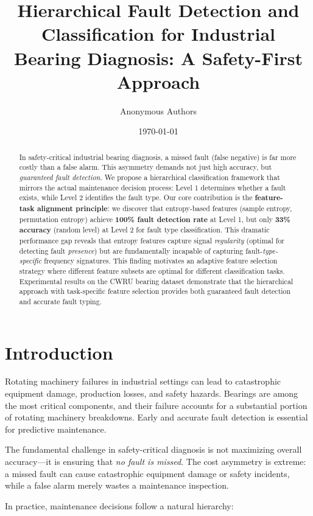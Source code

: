 \documentclass[11pt]{article}
\title{Hierarchical Fault Detection and Classification for Industrial Bearing Diagnosis: A Safety-First Approach}
\author{Anonymous Authors}
\date{\today}
\begin{document}
\maketitle

\begin{abstract}
In safety-critical industrial bearing diagnosis, a missed fault (false negative) is far more costly than a false alarm. This asymmetry demands not just high accuracy, but \emph{guaranteed fault detection}. We propose a hierarchical classification framework that mirrors the actual maintenance decision process: Level 1 determines whether a fault exists, while Level 2 identifies the fault type. Our core contribution is the \textbf{feature-task alignment principle}: we discover that entropy-based features (sample entropy, permutation entropy) achieve \textbf{100\% fault detection rate} at Level 1, but only \textbf{33\% accuracy} (random level) at Level 2 for fault type classification. This dramatic performance gap reveals that entropy features capture signal \emph{regularity} (optimal for detecting fault \emph{presence}) but are fundamentally incapable of capturing fault-\emph{type-specific} frequency signatures. This finding motivates an adaptive feature selection strategy where different feature subsets are optimal for different classification tasks. Experimental results on the CWRU bearing dataset demonstrate that the hierarchical approach with task-specific feature selection provides both guaranteed fault detection and accurate fault typing.
\end{abstract}

\section{Introduction}

Rotating machinery failures in industrial settings can lead to catastrophic equipment damage, production losses, and safety hazards. Bearings are among the most critical components, and their failure accounts for a substantial portion of rotating machinery breakdowns. Early and accurate fault detection is essential for predictive maintenance.

The fundamental challenge in safety-critical diagnosis is not maximizing overall accuracy---it is ensuring that \emph{no fault is missed}. The cost asymmetry is extreme: a missed fault can cause catastrophic equipment damage or safety incidents, while a false alarm merely wastes a maintenance inspection.

In practice, maintenance decisions follow a natural hierarchy:
\end{document}
